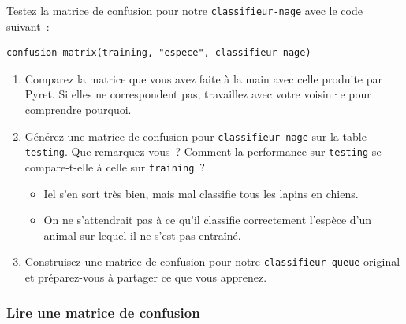 \documentclass[12pt,a4paper]{article}
\begin{document}
\begin{activitybox}
  Testez la matrice de confusion pour notre \texttt{classifieur-nage} avec le code suivant~:
  \begin{lstlisting}
confusion-matrix(training, "espece", classifieur-nage)
  \end{lstlisting}

  \begin{enumerate}[leftmargin=*]
    \item Comparez la matrice que vous avez faite à la main avec celle produite par Pyret. Si elles ne correspondent pas, travaillez avec votre voisin·e pour comprendre pourquoi.
    \item Générez une matrice de confusion pour \texttt{classifieur-nage} sur la table \texttt{testing}. Que remarquez-vous~? Comment la performance sur \texttt{testing} se compare-t-elle à celle sur \texttt{training}~?
    \begin{itemize}
      \item Iel s'en sort très bien, mais mal classifie tous les lapins en chiens.
      \item On ne s'attendrait pas à ce qu'il classifie correctement l'espèce d'un animal sur lequel il ne s'est pas entraîné.
    \end{itemize}
    \item Construisez une matrice de confusion pour notre \texttt{classifieur-queue} original et préparez-vous à partager ce que vous apprenez.
  \end{enumerate}
\end{activitybox}

\subsubsection{Lire une matrice de confusion}
\end{document}
